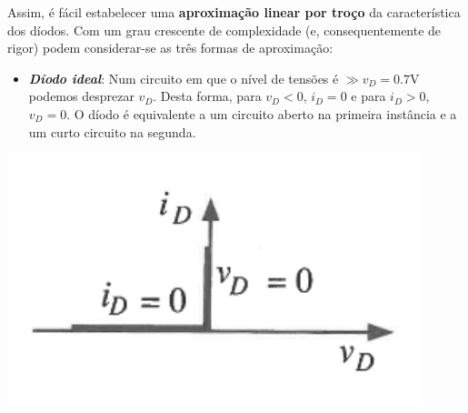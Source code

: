 \noindent Assim, é fácil estabelecer uma \textbf{aproximação linear por troço} da característica dos díodos. Com um grau crescente de complexidade (e, consequentemente de rigor) podem considerar-se as três formas de aproximação:

\vspace{0.5 em}
\begin{center}
    \begin{minipage}{0.6\textwidth}
        \begin{itemize}[leftmargin=*]
        \item[] \textbf{\emph{Díodo ideal}}: Num circuito em que o nível de tensões é $\gg v_D = 0.7$V podemos desprezar $v_D$. Desta forma, para $v_D < 0$, $i_D = 0$ e para $i_D > 0$, $v_D = 0$. O díodo é equivalente a um circuito aberto na primeira instância e a um curto circuito na segunda. 
        \end{itemize}
    \end{minipage}%
    \hfill
    \begin{minipage}{0.4\textwidth}
        \begin{center}
            \includegraphics[width=0.9\textwidth]{img/2/ideal.png}
            \label{img:ideal}
        \end{center}
    \end{minipage}
\end{center}

